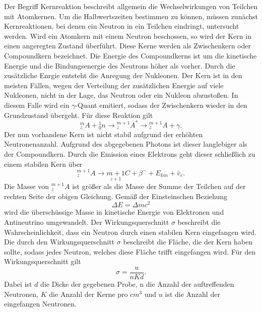 Der Begriff Kernreaktion beschreibt allgemein die Wechselwirkungen von Teilchen mit Atomkernen.
Um die Halbwertszeiten bestimmen zu können, müssen zunächst Kernreaktionen, bei denen ein Neutron in ein Teilchen
eindringt, untersucht werden. Wird ein Atomkern mit einem Neutron beschossen, so wird der Kern in einen angeregten Zustand überführt.
Diese Kerne werden als Zwischenkern oder Compoundkern bezeichnet.
Die Energie des Compoundkerns ist um die kinetische Energie und die Bindungsenergie des Neutrons höher als
vorher. Durch die zusätzliche Enrgie entsteht die Anregung der Nukleonen. Der Kern ist in den meisten Fällen, wegen der
Verteilung der zusätzlichen Energie auf viele Nukleonen, nicht in der Lage, das Neutron oder ein Nukleon abzustoßen.
In diesem Falle wird ein $\gamma$-Quant emitiert, sodass der Zwischenkern wieder in den Grundzustand übergeht.
Für diese Reaktion gilt
\begin{equation}
    { }_z^m A+{ }_0^1 n \rightarrow{ }_z^{m+1} A^* \rightarrow{ }_z^{m+1} A+\gamma .
    \label{eqn:vorher}
\end{equation}
Der nun vorhandene Kern ist nicht stabil aufgrund der erhöhten Neutronenanzahl. Aufgrund des abgegebenen
Photons ist dieser langlebiger als der Compoundkern. Durch die Emission eines Elektrons geht dieser schließlich zu einem 
stabilen Kern über
\begin{equation}
    { }_z^{m+1} A \rightarrow \underset{z+1}{m+1} C+\beta^{-}+E_{k i n}+\bar{v}_e .
    \label{eqn:stabil}
\end{equation}
Die Masse von ${ }_z^{m+1} A$ ist größer als die Masse der Summe der Teilchen auf der rechten Seite der obigen Gleichung.
Gemäß der Einsteinschen Beziehung 
\begin{equation*}
    \Delta E = \Delta m c^2
\end{equation*}
wird die überschüssige Masse in kinetische Energie von Elektronen und Antineutrino umgewandelt.
Der Wirkungsquerschnitt $\sigma$ beschreibt die Wahrscheinlichkeit, dass ein Neutron durch einen stabilen Kern
eingefangen wird. Die durch den Wirkungsquerschnitt $\sigma$ beschreibt die Fläche, die der Kern haben sollte,
sodass jedes Neutron, welches diese Fläche trifft eingefangen wird. Für den Wirkungsquerschnitt gilt
\begin{equation}
    \sigma = \frac{u}{nKd}.
    \label{eqn:wirkungs}
\end{equation}
Dabei ist $d$ die Dicke der gegebenen Probe, n die Anzahl der auftreffenden Neutronen, $K$ die Anzahl der Kerne pro $\si{cm}^3$
und $u$ ist die Anzahl der eingefangen Neutronen.
